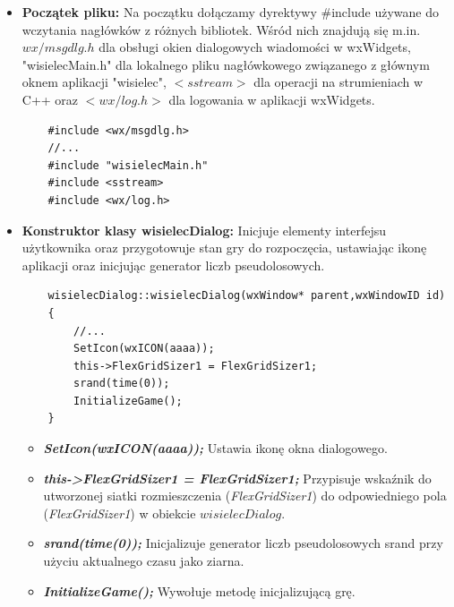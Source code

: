 \documentclass[]{report}
\begin{document}
	\begin{itemize}
		\item \textbf{Początek pliku:} Na początku dołączamy dyrektywy $\#$include używane do wczytania nagłówków z różnych bibliotek. Wśród nich znajdują się m.in. $wx/msgdlg.h$ dla obsługi okien dialogowych wiadomości w wxWidgets, "wisielecMain.h" dla lokalnego pliku nagłówkowego związanego z głównym oknem aplikacji "wisielec", $<sstream>$ dla operacji na strumieniach w C++ oraz $<wx/log.h>$ dla logowania w aplikacji wxWidgets.
		\begin{lstlisting}
	#include <wx/msgdlg.h>
	//...
	#include "wisielecMain.h"
	#include <sstream>
	#include <wx/log.h>
		\end{lstlisting}
		\item \textbf{Konstruktor klasy wisielecDialog:} Inicjuje elementy interfejsu użytkownika oraz przygotowuje stan gry do rozpoczęcia, ustawiając ikonę aplikacji oraz inicjując generator liczb pseudolosowych.
		\begin{lstlisting}
	wisielecDialog::wisielecDialog(wxWindow* parent,wxWindowID id)
	{
		//...
		SetIcon(wxICON(aaaa));
		this->FlexGridSizer1 = FlexGridSizer1;
		srand(time(0));
		InitializeGame();
	}
		\end{lstlisting}
		\begin{itemize}
			\item \textbf{\textit{SetIcon(wxICON(aaaa));}} Ustawia ikonę okna dialogowego.
			\item \textbf{\textit{this->FlexGridSizer1 = FlexGridSizer1;}} Przypisuje wskaźnik do utworzonej siatki rozmieszczenia (\textit{FlexGridSizer1}) do odpowiedniego pola (\textit{FlexGridSizer1}) w obiekcie $wisielecDialog$.
			\item \textbf{\textit{srand(time(0));}} Inicjalizuje generator liczb pseudolosowych srand przy użyciu aktualnego czasu jako ziarna.
			\item \textbf{\textit{InitializeGame();}} Wywołuje metodę inicjalizującą grę.
			

\end{itemize}
\end{itemize}
\end{document}
